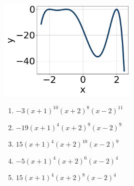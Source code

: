 \documentclass[14pt]{extbook}
\begin{document}
\begin{enumerate}
{\begin{center}
    \includegraphics[width=0.5\textwidth]{../Figures/polyGraphToFunctionB.png}
\end{center}
\begin{enumerate}[label=\Alph*.]
\item \( -3(x + 1)^{10} (x + 2)^{8} (x - 2)^{11} \)
\item \( -19(x + 1)^{4} (x + 2)^{9} (x - 2)^{9} \)
\item \( 15(x + 1)^{4} (x + 2)^{10} (x - 2)^{9} \)
\item \( -5(x + 1)^{4} (x + 2)^{6} (x - 2)^{4} \)
\item \( 15(x + 1)^{4} (x + 2)^{8} (x - 2)^{4} \)


\end{enumerate}}
\end{enumerate}
\end{document}
